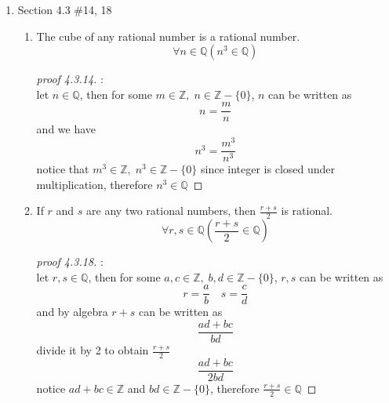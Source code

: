 \documentclass[12pt]{article}
\newcommand{\Z}{\mathbb{Z}}
\newcommand{\Q}{\mathbb{Q}}
\newcommand{\paren}[1]{\left( #1 \right)}
\newcommand{\zero}{\{0\}}
\begin{document}
\begin{enumerate}
    \item Section 4.3 \#14, 18
        \begin{enumerate}
            \item[14.] The cube of any rational number is a rational number.
            \[
            \forall n \in \Q \paren{n^3 \in \Q}
            \]
            \begin{proof}[proof 4.3.14]:\\
                let $n \in \Q$, then for some $m \in \Z, \; n \in \Z - \zero$, $n$ can be written as
                \[
                n = \frac{m}{n}
                \]
                and we have 
                \[
                n^3 = \frac{m^3}{n^3}
                \]
                notice that $m^3 \in \Z, \; n^3 \in \Z - \zero$ since integer is closed under multiplication, therefore $n^3 \in \Q$
                
            \end{proof}
            
            \item[18.]If \( r \) and \( s \) are any two rational numbers, then \( \frac{r + s}{2} \) is rational.
                \[
                \forall r, s \in \Q \paren{\frac{r + s}{2} \in \Q}
                \]
                \begin{proof}[proof 4.3.18]:\\
                    let $r,s \in \Q$, then for some $a,c \in \Z, \; b,d \in \Z - \zero$, $r,s$ can be written as
                    \[
                    r = \frac{a}{b} \quad s = \frac{c}{d}
                    \]
                    and by algebra $r+s$ can be written as 
                    \[
                    \frac{ad+bc}{bd}
                    \]
                    divide it by 2 to obtain $\frac{r+s}{2}$
                    \[
                    \frac{ad+bc}{2bd}
                    \]
                    notice $ad+bc \in \Z$ and $bd \in \Z - \zero$, therefore $\frac{r+s}{2}\in \Q$

                \end{proof}
                
        \end{enumerate}

        \newpage


\end{enumerate}
\end{document}
